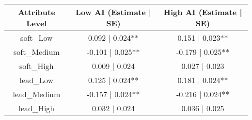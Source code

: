 \begin{table}[t]
\fontsize{12.0pt}{14.4pt}\selectfont
\begin{tabular*}{\linewidth}{@{\extracolsep{\fill}}ccc}
\toprule
Attribute Level & Low AI (Estimate | SE) & High AI (Estimate | SE) \\ 
\midrule\addlinespace[2.5pt]
soft\_Low & 0.092 | 0.024** & 0.151 | 0.023** \\ 
soft\_Medium & -0.101 | 0.025** & -0.179 | 0.025** \\ 
soft\_High & 0.009 | 0.024 & 0.027 | 0.023 \\ 
lead\_Low & 0.125 | 0.024** & 0.181 | 0.024** \\ 
lead\_Medium & -0.157 | 0.024** & -0.216 | 0.024** \\ 
lead\_High & 0.032 | 0.024 & 0.036 | 0.025 \\ 
\bottomrule
\end{tabular*}
\end{table}

